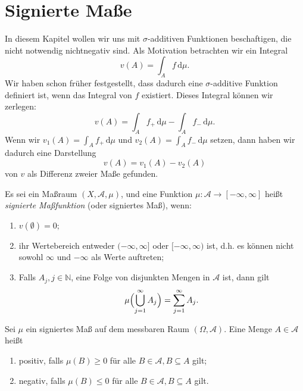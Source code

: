 \documentclass[/Users/zhangwusheng/Documents/satz von radon nikodym/satz von radon nikodym.tex]{subfiles}
\begin{document}
\section{Signierte Maße}
    In diesem Kapitel wollen wir uns mit $\sigma$-additiven Funktionen beschaftigen, die nicht notwendig nichtnegativ sind. 
    Als Motivation betrachten wir ein Integral
    \[v(A)=\int_{A} f\,\mathrm{d}\mu.\]
    Wir haben schon früher festgestellt, dass dadurch eine $\sigma$-additive Funktion definiert ist, wenn das Integral von $f$ existiert. 
    Dieses Integral können wir zerlegen:
    \[v(A)=\int_{A} f_{+}\,\mathrm{d}\mu - \int_{A} f_{-}\,\mathrm{d}\mu.\]
    Wenn wir $v_1(A) =\int_{A}f_{+}\,\mathrm{d}\mu$ und $v_2(A) =\int_{A}f_{-}\,\mathrm{d}\mu$ setzen, dann haben wir dadurch eine Darstellung
    \[v(A) = v_1(A) - v_2(A)\]
    von $v$ als Differenz zweier Maße gefunden.
    \begin{mdframed}[style=mdfexample]
        \begin{definition}
            Es sei ein Maßraum $(X, \mathcal{A}, \mu)$, und eine Funktion $\mu: \mathcal{A} \rightarrow [-\infty, \infty]$ heißt \textit{signierte Maßfunktion} (oder signiertes Maß), wenn:
            \begin{enumerate}
            \setlength\itemsep{-1em}
                \item $v(\emptyset) =0;$\\
                \item ihr Wertebereich entweder $(-\infty, \infty]$ oder $[−\infty, \infty)$ ist, d.h. es können nicht sowohl $\infty$ und $−\infty$ als Werte auftreten;\\
                \item Falls $A_{j}, j \in \mathbb{N}$, eine Folge von disjunkten Mengen in $\mathcal{A}$ ist, dann gilt 
                \[\mu \Bigl(\bigcup_{j=1}^\infty A_{j}\Bigr) =\sum_{j=1}^\infty A_{j}.\]
            \end{enumerate}
        \end{definition}

        \begin{definition}
            Sei $\mu$ ein signiertes Maß auf dem messbaren Raum $(\Omega, \mathcal{A})$. Eine Menge $A \in \mathcal{A}$ heißt
            \begin{enumerate}
            \setlength\itemsep{-1em}
                \item positiv, falls $\mu(B) \geq 0$ für alle $B \in \mathcal{A}, B \subseteq A$ gilt;\\
                \item negativ, falls $\mu(B) \leq 0$ für alle $B \in \mathcal{A}, B \subseteq A$ gilt.
            \end{enumerate}
        \end{definition}
    \end{mdframed}
     
\end{document}
